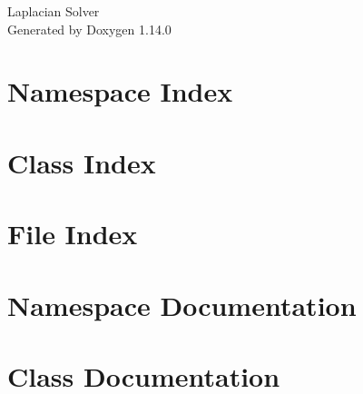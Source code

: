 \documentclass[twoside]{book}
\newcommand{\+}{\discretionary{\mbox{\scriptsize$\hookleftarrow$}}{}{}}
\newcommand{\clearemptydoublepage}{%
    \newpage{\pagestyle{empty}\cleardoublepage}%
  }
\begin{document}
  \raggedbottom
    \hypersetup{pageanchor=false,
                bookmarksnumbered=true,
                pdfencoding=unicode
               }
  \begin{titlepage}
  \vspace*{7cm}
  \begin{center}%
  {\Large Laplacian Solver}\\
  \vspace*{1cm}
  {\large Generated by Doxygen 1.14.0}\\
  \end{center}
  \end{titlepage}
  \clearemptydoublepage
  \tableofcontents
  \clearemptydoublepage
  \hypersetup{pageanchor=true}

\chapter{Namespace Index}

\chapter{Class Index}

\chapter{File Index}

\chapter{Namespace Documentation}




\chapter{Class Documentation}










\end{document}
